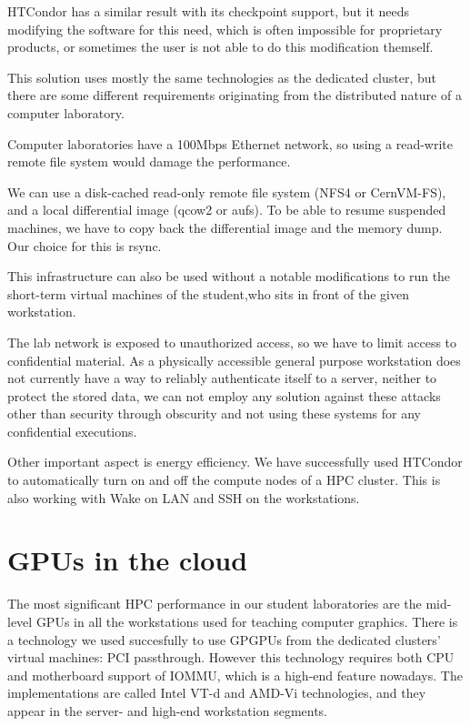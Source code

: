\documentclass{llncs}
\begin{document}
HTCondor has a similar result with its checkpoint support, but it needs modifying the software for this need, which is often impossible for proprietary products, or sometimes the user is not able to do this modification themself.

This solution uses mostly the same technologies as the dedicated cluster, but there are some different requirements originating from the distributed nature of a computer laboratory.

Computer laboratories have a 100Mbps Ethernet network, so using a read-write remote file system would damage the performance.

We can use a disk-cached read-only remote file system (NFS4 or CernVM-FS), and a local differential image (qcow2 or aufs). To be able to resume suspended machines, we have to copy back the differential image and the memory dump. Our choice for this is rsync.

This infrastructure can also be used without a notable modifications to run the short-term virtual machines of the student,who sits in front of the given workstation.

The lab network is exposed to unauthorized access, so we have to limit access to confidential material. As a physically accessible general purpose workstation does not currently have a way to reliably authenticate itself to a server, neither to protect the stored data, we can not employ any solution against these attacks other than security through obscurity and not using these systems for any confidential executions.

Other important aspect is energy efficiency. We have successfully used HTCondor to automatically turn on and off the compute nodes of a HPC cluster. This is also working with Wake on LAN and SSH on the workstations.

\section{GPUs in the cloud}
The most significant HPC performance in our student laboratories are the mid-level GPUs in all the workstations used for teaching computer graphics. There is a technology we used succesfully to use GPGPUs from the dedicated clusters' virtual machines: PCI passthrough. However this technology requires both CPU and motherboard support of IOMMU, which is a high-end feature nowadays. The implementations are called Intel VT-d and AMD-Vi technologies, and they appear in the server- and high-end workstation segments.
\end{document}

